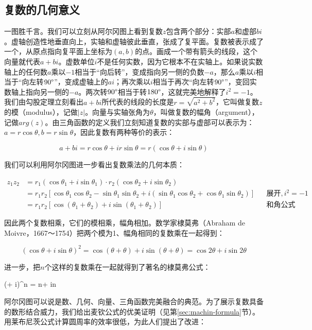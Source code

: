 \documentclass[b5paper]{ctexart}
\begin{document}
\subsection{复数的几何意义}
一图胜千言。我们可以立刻从阿尔冈图上看到复数$z$包含两个部分：实部$a$和虚部$bi$。虚轴创造性地垂直向上，实轴和虚轴彼此垂直，张成了复平面。复数被表示成了一个，从原点指向复平面上坐标为$(a, b)$的点。画成一个带有箭头的线段，这个向量就代表$a + bi$。虚数单位$i$不是任何实数，因为它根本不在实轴上。如果说实数轴上的任何数$a$乘以$-1$相当于“向后转”，变成指向另一侧的负数$-a$，那么$a$乘以$i$相当于“向左转$90\degree$”，变成虚轴上的$ai$；再次乘以$i$相当于再次“向左转$90\degree$”，变回实数轴上指向另一侧的$-a$。两次转$90\degree$相当于转$180\degree$，这就完美地解释了$i^2 = -1$。我们由勾股定理立刻看出$a + bi$所代表的线段的长度是$r = \sqrt{a^2 + b^2}$，它叫做复数$z$的模（modulus），记做$|z|$。向量与实轴张角为$\theta$，叫做复数的幅角（argument），记做$arg(z)$。由三角函数的定义我们立刻知道复数的实部与虚部可以表示为：$a = r\cos\theta, b = r\sin\theta$，因此复数有两种等价的表示：

\[
a + bi = r\cos\theta + ir\sin\theta = r(\cos\theta + i\sin\theta)
\]

我们可以利用阿尔冈图进一步看出复数乘法的几何本质：

\begin{align*}
z_1z_2 &= r_1(\cos\theta_1 + i\sin\theta_1) \cdot r_2(\cos\theta_2 + i\sin\theta_2) \\
  &= r_1r_2[\cos\theta_1\cos\theta_2 - \sin\theta_1\sin\theta_2 + i(\sin\theta_1\cos\theta_2 + \cos\theta_1\sin\theta_2)] && \text{展开}, i^2 = -1 \\
  &= r_1r_2[\cos(\theta_1 + \theta_2) + i\sin(\theta_1 + \theta_2)] && \text{和角公式}
\end{align*}

\label{sec:proof-to-machin}
因此两个复数相乘，它们的模相乘，幅角相加。数学家棣莫弗（Abraham de Moivre，1667～1754）把两个模为1、幅角相同的复数乘在一起得到：

\[
(\cos \theta + i\sin \theta)^2 = \cos (\theta + \theta) + i\sin (\theta + \theta) = \cos 2\theta + i\sin 2\theta
\]

进一步，把$n$个这样的复数乘在一起就得到了著名的棣莫弗公式：

\be \label{eq:de-Moivre}
(\cos \theta + i\sin \theta)^n = \cos n\theta + i\sin n\theta
\ee

阿尔冈图可以说是数、几何、向量、三角函数完美融合的典范。为了展示复数具备的数形结合威力，我们给出麦钦公式的优美证明（见第\ref{sec:machin-formula}节）。用莱布尼茨公式计算圆周率的效率很低，为此人们提出了改进：
\end{document}
